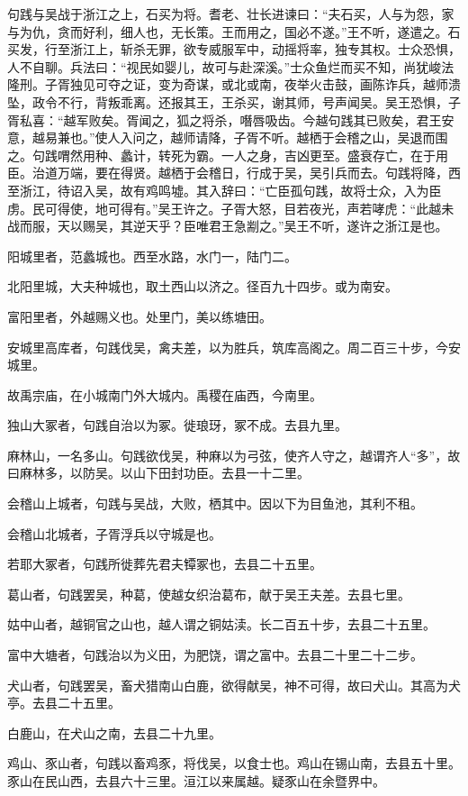 \documentclass[12pt,UTF8]{ctexbook}
\begin{document}
句践与吴战于浙江之上，石买为将。耆老、壮长进谏曰：“夫石买，人与为怨，家与为仇，贪而好利，细人也，无长策。王而用之，国必不遂。”王不听，遂遣之。石买发，行至浙江上，斩杀无罪，欲专威服军中，动摇将率，独专其权。士众恐惧，人不自聊。兵法曰：“视民如婴儿，故可与赴深溪。”士众鱼烂而买不知，尚犹峻法隆刑。子胥独见可夺之证，变为奇谋，或北或南，夜举火击鼓，画陈诈兵，越师溃坠，政令不行，背叛乖离。还报其王，王杀买，谢其师，号声闻吴。吴王恐惧，子胥私喜：“越军败矣。胥闻之，狐之将杀，噆唇吸齿。今越句践其已败矣，君王安意，越易兼也。”使人入问之，越师请降，子胥不听。越栖于会稽之山，吴退而围之。句践喟然用种、蠡计，转死为霸。一人之身，吉凶更至。盛衰存亡，在于用臣。治道万端，要在得贤。越栖于会稽日，行成于吴，吴引兵而去。句践将降，西至浙江，待诏入吴，故有鸡鸣墟。其入辞曰：“亡臣孤句践，故将士众，入为臣虏。民可得使，地可得有。”吴王许之。子胥大怒，目若夜光，声若哮虎：“此越未战而服，天以赐吴，其逆天乎？臣唯君王急剬之。”吴王不听，遂许之浙江是也。

阳城里者，范蠡城也。西至水路，水门一，陆门二。

北阳里城，大夫种城也，取土西山以济之。径百九十四步。或为南安。

富阳里者，外越赐义也。处里门，美以练塘田。

安城里高库者，句践伐吴，禽夫差，以为胜兵，筑库高阁之。周二百三十步，今安城里。

故禹宗庙，在小城南门外大城内。禹稷在庙西，今南里。

独山大冢者，句践自治以为冢。徙琅玡，冢不成。去县九里。

麻林山，一名多山。句践欲伐吴，种麻以为弓弦，使齐人守之，越谓齐人“多”，故曰麻林多，以防吴。以山下田封功臣。去县一十二里。

会稽山上城者，句践与吴战，大败，栖其中。因以下为目鱼池，其利不租。

会稽山北城者，子胥浮兵以守城是也。

若耶大冢者，句践所徙葬先君夫镡冢也，去县二十五里。

葛山者，句践罢吴，种葛，使越女织治葛布，献于吴王夫差。去县七里。

姑中山者，越铜官之山也，越人谓之铜姑渎。长二百五十步，去县二十五里。

富中大塘者，句践治以为义田，为肥饶，谓之富中。去县二十里二十二步。

犬山者，句践罢吴，畜犬猎南山白鹿，欲得献吴，神不可得，故曰犬山。其高为犬亭。去县二十五里。

白鹿山，在犬山之南，去县二十九里。

鸡山、豕山者，句践以畜鸡豕，将伐吴，以食士也。鸡山在锡山南，去县五十里。豕山在民山西，去县六十三里。洹江以来属越。疑豕山在余暨界中。
\end{document}
